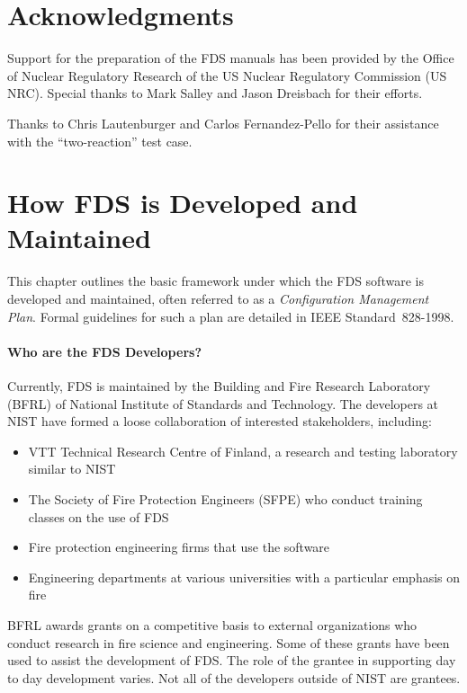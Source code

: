 \documentclass[11pt]{book}
\begin{document}
\chapter{Acknowledgments}

\label{acksection}

Support for the preparation of the FDS
manuals has been provided by the Office of Nuclear Regulatory Research
of the US Nuclear Regulatory Commission (US NRC). Special thanks to
Mark Salley and Jason Dreisbach for their efforts.

Thanks to Chris Lautenburger and Carlos Fernandez-Pello for their assistance with the ``two-reaction'' test case.




\tableofcontents

\mainmatter






\chapter{How FDS is Developed and Maintained}

This chapter outlines the basic framework under which the FDS software is developed and maintained, often referred to as a
{\em Configuration Management Plan}. Formal guidelines for such a plan are detailed in IEEE Standard~828-1998.


\subsubsection{Who are the FDS Developers?}

Currently, FDS is maintained by the Building and Fire Research Laboratory (BFRL) of National Institute of Standards and Technology. The developers
at NIST have formed a loose collaboration of interested stakeholders, including:
\begin{itemize}
\item VTT Technical Research Centre of Finland, a research and testing
laboratory similar to NIST
\item The Society of Fire Protection Engineers (SFPE) who conduct training classes on the use of FDS
\item Fire protection engineering firms that use the software
\item Engineering departments at various universities with a particular emphasis on fire
\end{itemize}
BFRL awards grants on a competitive basis to external organizations who conduct research in fire science and engineering. Some of these grants have
been used to assist the development of FDS. The role of the grantee in supporting day to day development varies. Not all of the developers outside
of NIST are grantees.
\end{document}
